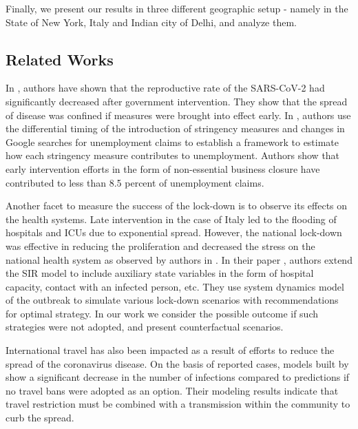 \documentclass[preprint,authoryear,12pt]{elsarticle}
\begin{document}
	Finally, we present our results in three different geographic setup - namely in the State of New York, Italy and Indian city of Delhi, and analyze them. 
	
	\subsection{Related Works}
	In \cite{Koh2020}, authors have shown that the reproductive rate of the SARS-CoV-2 had significantly decreased after government intervention. They show that the spread of disease was confined if measures were brought into effect early. In \cite{KP2020}, authors use the differential timing of the introduction of stringency measures and changes in Google searches for unemployment claims to establish a framework to estimate how each stringency measure contributes to unemployment. Authors show that early intervention efforts in the form of non-essential business closure have contributed to less than 8.5 percent of unemployment claims.
	
	Another facet to measure the success of the lock-down is to observe its effects on the health systems. Late intervention in the case of Italy led to the flooding of hospitals and ICUs due to exponential spread. However, the national lock-down was effective in reducing the proliferation and decreased the stress on the national health system as observed by authors in \cite{Supino2020}. In their paper \cite{IVEGA2020},  authors extend the SIR model to include auxiliary state variables in the form of hospital capacity, contact with an infected person, etc. They use system dynamics model of the outbreak to simulate various lock-down scenarios with recommendations for optimal strategy. In our work we consider the possible outcome if such strategies were not adopted,  and present counterfactual scenarios.
	
	International travel has also been impacted as a result of efforts to reduce the spread of the coronavirus disease. On the basis of reported cases, models built by \cite{Chinazzi395} show a significant decrease in the number of infections compared to predictions if no travel bans were adopted as an option. Their modeling results indicate that travel restriction must be combined with a transmission within the community to curb the spread.
	
\end{document}
